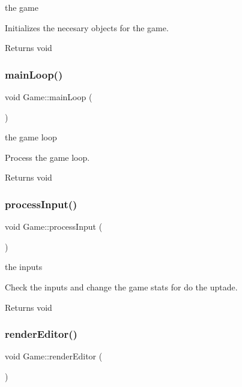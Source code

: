 the game

Initializes the necesary objects for the game.

\begin{DoxyReturn}{Returns}
void 
\end{DoxyReturn}
\mbox{\label{class_game_ae89e277761b7dc5bc7a23fd1b4c6f17d}} 
\subsubsection{\texorpdfstring{main\+Loop()}{mainLoop()}}
{\footnotesize\ttfamily void Game\+::main\+Loop (\begin{DoxyParamCaption}{ }\end{DoxyParamCaption})}

the game loop

Process the game loop.

\begin{DoxyReturn}{Returns}
void 
\end{DoxyReturn}
\mbox{\label{class_game_a815a3ec2787b4b1c4077d28165c380e8}} 
\subsubsection{\texorpdfstring{process\+Input()}{processInput()}}
{\footnotesize\ttfamily void Game\+::process\+Input (\begin{DoxyParamCaption}{ }\end{DoxyParamCaption})}

the inputs

Check the inputs and change the game stats for do the uptade.

\begin{DoxyReturn}{Returns}
void 
\end{DoxyReturn}
\mbox{\label{class_game_a204ea65111892ca826f3a65cc8818ea7}} 
\subsubsection{\texorpdfstring{render\+Editor()}{renderEditor()}}
{\footnotesize\ttfamily void Game\+::render\+Editor (\begin{DoxyParamCaption}{ }\end{DoxyParamCaption})}

